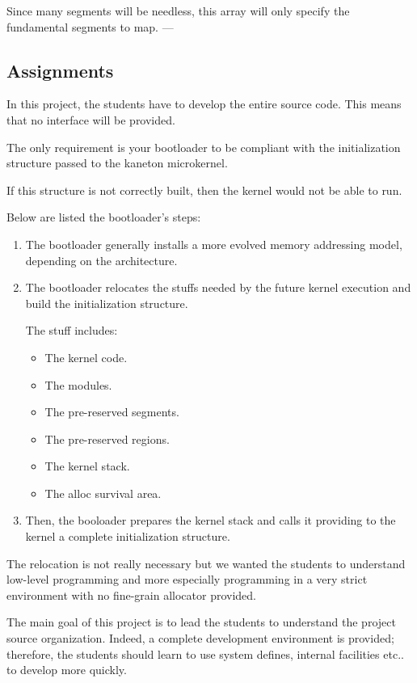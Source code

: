     Since many segments will be needless, this array will only specify the
    fundamental segments to map.
---

%
%

\subsection{Assignments}

In this project, the students have to develop the entire source code.
This means that no interface will be provided.

The only requirement is your bootloader to be compliant with the
initialization structure passed to the kaneton microkernel.

If this structure is not correctly built, then the kernel would not
be able to run.

Below are listed the bootloader's steps:

\begin{enumerate}
  \item
    The bootloader generally installs a more evolved memory addressing model,
    depending on the architecture.
  \item
    The bootloader relocates the stuffs needed by the future kernel
    execution and build the initialization structure.

    The stuff includes:

    \begin{itemize}
      \item
	The kernel code.
      \item
	The modules.
      \item
	The pre-reserved segments.
      \item
	The pre-reserved regions.
      \item
	The kernel stack.
      \item
	The alloc survival area.
    \end{itemize}
  \item
    Then, the booloader prepares the kernel stack and calls it providing
    to the kernel a complete initialization structure.
\end{enumerate}

The relocation is not really necessary but we wanted the students
to understand low-level programming and more especially programming
in a very strict environment with no fine-grain allocator provided.

The main goal of this project is to lead the students to understand the
project source organization. Indeed, a complete development environment
is provided; therefore, the students should learn to use system defines,
internal facilities etc.. to develop more quickly.

